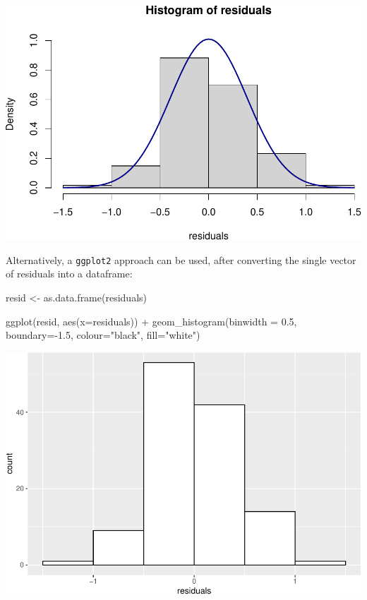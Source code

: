 \documentclass[
]{memoir}
\newenvironment{Shaded}{\begin{snugshade}}{\end{snugshade}}
\newcommand{\AttributeTok}[1]{\textcolor[rgb]{0.77,0.63,0.00}{#1}}
\newcommand{\FloatTok}[1]{\textcolor[rgb]{0.00,0.00,0.81}{#1}}
\newcommand{\FunctionTok}[1]{\textcolor[rgb]{0.00,0.00,0.00}{#1}}
\newcommand{\NormalTok}[1]{#1}
\newcommand{\OtherTok}[1]{\textcolor[rgb]{0.56,0.35,0.01}{#1}}
\newcommand{\SpecialCharTok}[1]{\textcolor[rgb]{0.00,0.00,0.00}{#1}}
\newcommand{\StringTok}[1]{\textcolor[rgb]{0.31,0.60,0.02}{#1}}
\begin{document}
\includegraphics{08.1-correlation-regression-R_files/figure-latex/unnamed-chunk-11-1.pdf}

Alternatively, a \texttt{ggplot2} approach can be used, after converting the single vector of residuals into a dataframe:

\begin{Shaded}
\begin{Highlighting}[]
\NormalTok{resid }\OtherTok{\textless{}{-}} \FunctionTok{as.data.frame}\NormalTok{(residuals)}

\FunctionTok{ggplot}\NormalTok{(resid, }\FunctionTok{aes}\NormalTok{(}\AttributeTok{x=}\NormalTok{residuals)) }\SpecialCharTok{+} 
  \FunctionTok{geom\_histogram}\NormalTok{(}\AttributeTok{binwidth =} \FloatTok{0.5}\NormalTok{, }\AttributeTok{boundary=}\SpecialCharTok{{-}}\FloatTok{1.5}\NormalTok{, }\AttributeTok{colour=}\StringTok{"black"}\NormalTok{, }\AttributeTok{fill=}\StringTok{"white"}\NormalTok{)}
\end{Highlighting}
\end{Shaded}

\includegraphics{08.1-correlation-regression-R_files/figure-latex/unnamed-chunk-12-1.pdf}
\end{document}
